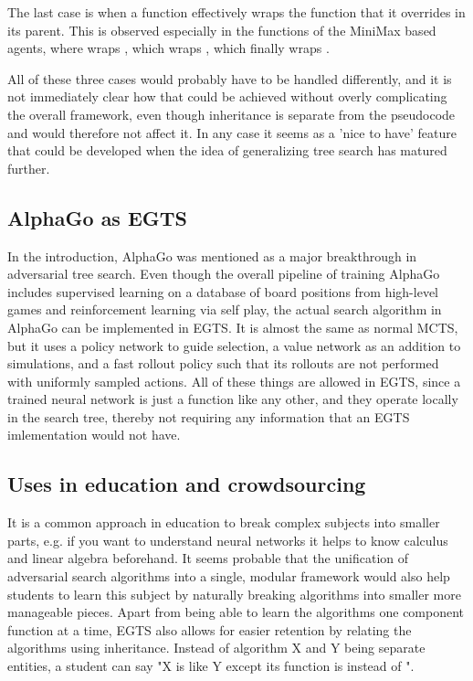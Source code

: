 The last case is when a function effectively wraps the function that it overrides in its parent. This is observed especially in the \expand functions of the MiniMax based agents, where  wraps , which wraps , which finally wraps . 

All of these three cases would probably have to be handled differently, and it is not immediately clear how that could be achieved without overly complicating the overall framework, even though inheritance is separate from the pseudocode and would therefore not affect it. In any case it seems as a 'nice to have' feature that could be developed when the idea of generalizing tree search has matured further.

\subsection{AlphaGo as EGTS}
In the introduction, AlphaGo was mentioned as a major breakthrough in adversarial tree search. Even though the overall pipeline of training AlphaGo includes supervised learning on a database of board positions from high-level games and reinforcement learning via self play, the actual search algorithm in AlphaGo can be implemented in EGTS. It is almost the same as normal MCTS, but it uses a policy network to guide selection, a value network as an addition to simulations, and a fast rollout policy such that its rollouts are not performed with uniformly sampled actions. All of these things are allowed in EGTS, since a trained neural network is just a function like any other, and they operate locally in the search tree, thereby not requiring any information that an EGTS imlementation would not have.

\subsection{Uses in education and crowdsourcing}
It is a common approach in education to break complex subjects into smaller parts, e.g. if you want to understand neural networks it helps to know calculus and linear algebra beforehand. It seems probable that the unification of adversarial search algorithms into a single, modular framework would also help students to learn this subject by naturally breaking algorithms into smaller more manageable pieces. Apart from being able to learn the algorithms one component function at a time, EGTS also allows for easier retention by relating the algorithms using inheritance. Instead of algorithm X and Y being separate entities, a student can say "X is like Y except its \expand function is  instead of ".

